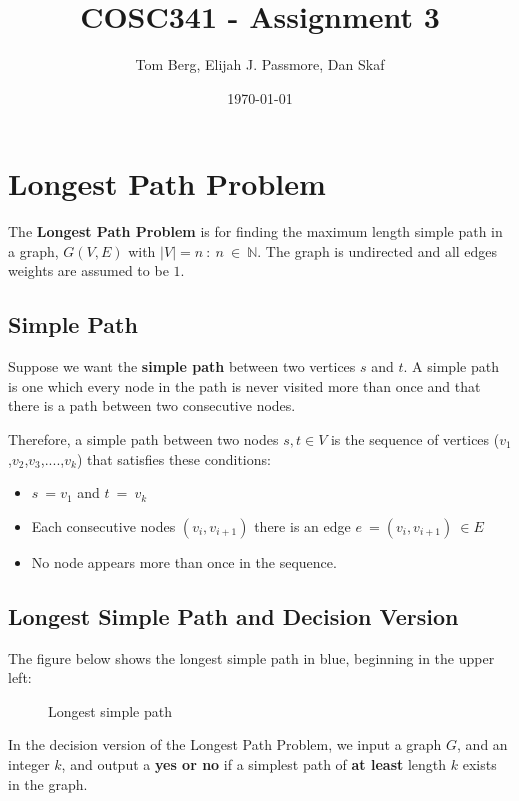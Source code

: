 \documentclass[a4paper,11pt]{article}
\title{COSC341 - Assignment 3}
\author{Tom Berg, Elijah J. Passmore, Dan Skaf}
\date{\today}
\begin{document}
\maketitle
\tableofcontents

\section{Longest Path Problem}

The \textbf{Longest Path Problem} is for finding the maximum length simple path
in a graph, $G(V,E)$ with $\left|V\right|=n\::\:n\:\in\:\mathbb{N}$.  The graph
is undirected and all edges weights are assumed to be $1$.

\subsection{Simple Path}

Suppose we want the \textbf{simple path} between two vertices $s$ and $t$.  A
simple path is one which every node in the path is never visited more than once
and that there is a path between two consecutive nodes.

Therefore, a simple path between two nodes $s,t\in V$ is the sequence of
vertices ($v_1$,$v_2$,$v_3$,$....$,$v_k$) that satisfies these conditions:

\begin{itemize}
    \item $s\:=v_1$ and $t\:=\:v_k$
    \item Each consecutive nodes $\left(v_i,v_{i+1}\right)$ there is an edge
          $e\:=\left(v_i,v_{i+1}\right)\:\in E$
    \item No node appears more than once in the sequence.
\end{itemize}

\subsection{Longest Simple Path and Decision Version}

The figure below shows the longest simple path in blue, beginning in the upper
left:

\begin{figure}[!h]
    \centering {}
    \caption{Longest simple path}
\end{figure}

In the decision version of the Longest Path Problem, we input a graph $G$, and
an integer $k$, and output a \textbf{yes or no} if a simplest path of
\textbf{at least} length $k$ exists in the graph.
\end{document}
